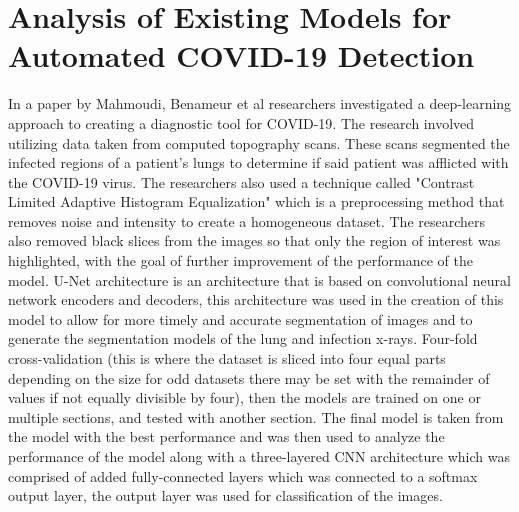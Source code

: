 \section{Analysis of Existing Models for Automated COVID-19 Detection}
In a paper by Mahmoudi, Benameur et al \cite{litReviewDeepLearningCovid19} researchers investigated a deep-learning approach to creating a diagnostic tool for COVID-19.  The research involved utilizing data taken from computed topography scans.  These scans segmented the infected regions of a patient's lungs to determine if said patient was afflicted with the COVID-19 virus.  The researchers also used a technique called "Contrast Limited Adaptive Histogram Equalization" which is a preprocessing method that removes noise and intensity to create a homogeneous dataset.  The researchers also removed black slices from the images so that only the region of interest was highlighted, with the goal of further improvement of the performance of the model.  U-Net architecture is an architecture that is based on convolutional neural network encoders and decoders, this architecture was used in the creation of this model to allow for more timely and accurate segmentation of images and to generate the segmentation models of the lung and infection x-rays.  Four-fold cross-validation (this is where the dataset is sliced into four equal parts depending on the size for odd datasets there may be set with the remainder of values if not equally divisible by four), then the models are trained on one or multiple sections, and tested with another section. The final model is taken from the model with the best performance and was then used to analyze the performance of the model along with a three-layered CNN architecture which was comprised of added fully-connected layers which was connected to a softmax output layer, the output layer was used for classification of the images. 
